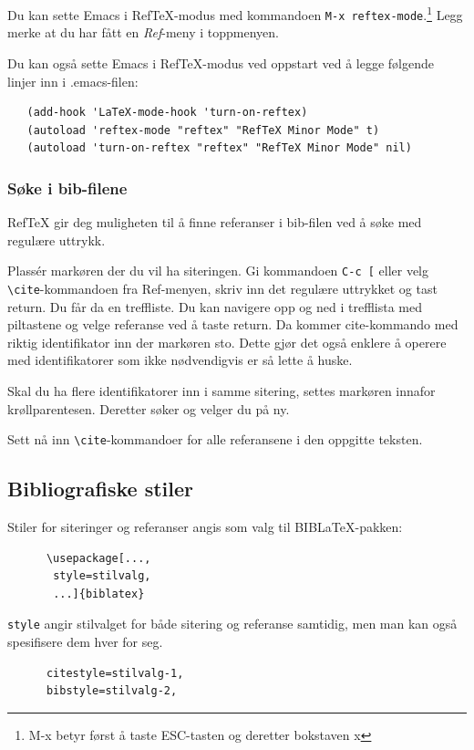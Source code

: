 \documentclass[11pt,norsk,a4paper]{article}
\newcommand{\kdo}[1]{\texttt{#1}}
\newcommand{\blt}{B{\smaller[2]IB}\discretionary{-}{}{\kern
    -0.12em}\LaTeX{}}
\begin{document}
Du kan sette Emacs i RefTeX-modus med kommandoen {\footnotesize \verb=M-x reftex-mode=}.\footnote{M-x betyr først å taste ESC-tasten og deretter bokstaven x} 
Legg merke at du har fått en \textit{Ref}-meny i
toppmenyen.

Du kan også sette Emacs i RefTeX-modus ved oppstart ved å legge følgende
linjer inn i .emacs-filen:

{\footnotesize\begin{verbatim}
   (add-hook 'LaTeX-mode-hook 'turn-on-reftex)
   (autoload 'reftex-mode "reftex" "RefTeX Minor Mode" t)
   (autoload 'turn-on-reftex "reftex" "RefTeX Minor Mode" nil)
\end{verbatim}}

\subsubsection*{Søke i bib-filene}
RefTeX gir deg muligheten til å finne referanser i bib-filen ved å
søke med regulære uttrykk.

Plassér markøren der du vil ha siteringen. Gi kommandoen
\verb=C-c [= eller velg \verb/\cite/-kommandoen fra Ref-menyen,
skriv inn det regulære uttrykket og tast return. Du får da
 en treffliste. Du kan navigere opp og ned i trefflista med
piltastene og velge referanse ved å taste return. Da kommer
cite-kommando med riktig identifikator inn der markøren sto. Dette
gjør det også enklere å operere med identifikatorer som ikke
nødvendigvis er så lette å huske.

Skal du ha flere identifikatorer inn i samme sitering, settes markøren
innafor krøllparentesen. Deretter søker og velger du på ny.

Sett nå inn \verb=\cite=-kommandoer for alle referansene i den
oppgitte teksten.

\subsection{Bibliografiske stiler}
Stiler for siteringer og referanser angis som valg til
\blt-pakken:

{\footnotesize\begin{verbatim}
      \usepackage[...,
       style=stilvalg,
       ...]{biblatex}
\end{verbatim}}

\kdo{style} angir stilvalget for både sitering og referanse samtidig,
men man kan også spesifisere dem hver for seg.

{\footnotesize\begin{verbatim}
      citestyle=stilvalg-1,
      bibstyle=stilvalg-2,
\end{verbatim}}
\end{document}
